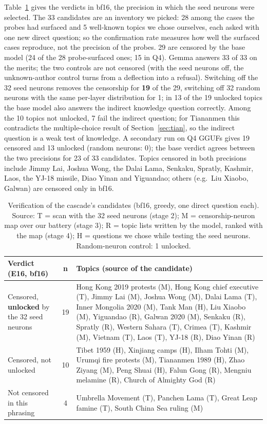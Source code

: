 Table~\ref{tab:e16} gives the verdicts in bf16, the precision in which the seed neurons were selected. The 33
candidates are an inventory we picked: 28 among the cases the probes had surfaced and 5 well-known
topics we chose ourselves, each asked with one new direct question; so the confirmation rate measures how well the surfaced cases
reproduce, not the precision of the probes. 29 are censored by the base model (24 of the 28
probe-surfaced ones; 15 in Q4). Gemma answers 33 of 33 on the merits; the two controls are not
censored (with the seed neurons off, the unknown-author control turns from a deflection into a refusal). Switching off the 32 seed
neurons removes the censorship for \textbf{19} of the 29, switching off 32 random neurons with the same per-layer
distribution for 1; in 13 of the 19 unlocked topics the base model also answers the indirect knowledge question
correctly. Among the 10 topics not unlocked, 7 fail the indirect question; for Tiananmen this contradicts the
multiple-choice result of Section~\ref{sec:tian}, so the indirect question is a weak test of knowledge. A secondary run on Q4 GGUFs gives
19 censored and 13 unlocked (random neurons: 0); the base verdict agrees between the two precisions for 23 of
33 candidates. Topics censored in both precisions include Jimmy Lai, Joshua Wong, the Dalai Lama, Senkaku, Spratly,
Kashmir, Laos, the YJ-18 missile, Diao Yinan and Yiguandao; others (e.g.\ Liu Xiaobo, Galwan) are censored only in bf16.

\begin{table}[h]\centering\small
\begin{tabularx}{\textwidth}{>{\raggedright\arraybackslash}p{3.2cm}c>{\raggedright\arraybackslash}X}\toprule
Verdict (E16, bf16) & n & Topics (source of the candidate)\\\midrule
Censored, \textbf{unlocked} by the 32 seed neurons & 19 & Hong Kong 2019 protests (M), Hong Kong chief executive (T), Jimmy Lai (M), Joshua Wong (M), Dalai Lama (T), Inner Mongolia 2020 (M), Tank Man (H), Liu Xiaobo (M), Yiguandao (R), Galwan 2020 (M), Senkaku (R), Spratly (R), Western Sahara (T), Crimea (T), Kashmir (M), Vietnam (T), Laos (T), YJ-18 (R), Diao Yinan (R)\\
Censored, not unlocked & 10 & Tibet 1959 (H), Xinjiang camps (H), Ilham Tohti (M), Urumqi fire protests (M), Tiananmen 1989 (H), Zhao Ziyang (M), Peng Shuai (H), Falun Gong (R), Mengniu melamine (R), Church of Almighty God (R)\\
Not censored in this phrasing & 4 & Umbrella Movement (T), Panchen Lama (T), Great Leap famine (T), South China Sea ruling (M)\\\bottomrule
\end{tabularx}
\caption{Verification of the cascade's candidates (bf16, greedy, one direct question each). Source: T = scan with the 32 seed
neurons (stage 2); M = censorship-neuron map over our battery (stage 3); R = topic lists written by the model, ranked with the
map (stage 4); H = questions we chose while testing the seed neurons. Random-neuron control: 1 unlocked.\label{tab:e16}}
\end{table}
